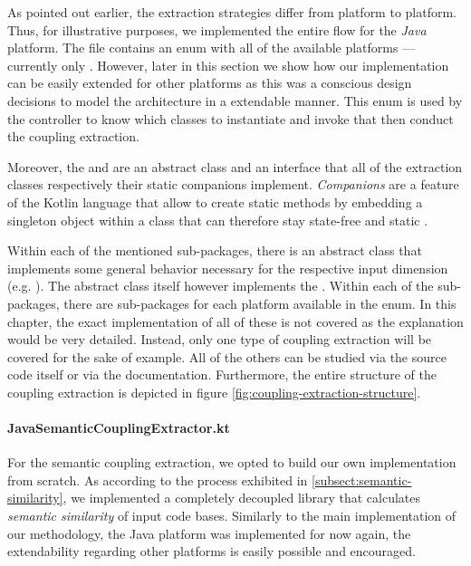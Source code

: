 \documentclass[12pt,a4paper]{report}
\begin{document}
As pointed out earlier, the extraction strategies differ from platform to platform.
Thus, for illustrative purposes, we implemented the entire flow for the \textit{Java}
platform. The  file contains an enum with all of the available
platforms --- currently only . However, later in this section we show
how our implementation can be easily extended for other platforms as this was a
conscious design decisions to model the architecture in a extendable manner.
This enum is used by the controller to know which classes to instantiate and invoke
that then conduct the coupling extraction.

Moreover, the  and  are an abstract
class and an interface that all of the extraction classes respectively their
static companions implement. \textit{Companions} are a feature of the Kotlin language
that allow to create static methods by embedding a singleton object within a class
that can therefore stay state-free and static \cite{kotlin-companions}.

Within each of the mentioned sub-packages, there is an abstract class that implements
some general behavior necessary for the respective input dimension
(e.g. ). The abstract class itself however
implements the .
Within each of the sub-packages, there are sub-packages for each platform available
in the  enum.
In this chapter, the exact implementation of all of these is not covered as the
explanation would be very detailed. Instead, only one type of coupling extraction
will be covered for the sake of example. All of the others can be studied via the
source code itself or via the documentation.
Furthermore, the entire structure of the coupling extraction is depicted in figure
\ref{fig:coupling-extraction-structure}.

\paragraph{JavaSemanticCouplingExtractor.kt}
For the semantic coupling extraction, we opted to build our own implementation
from scratch. As according to the process exhibited in \ref{subsect:semantic-similarity},
we implemented a completely decoupled library that calculates \textit{semantic similarity}
of input code bases. Similarly to the main implementation of our methodology,
the Java platform was implemented for now again, the extendability regarding other
platforms is easily possible and encouraged.
\end{document}
